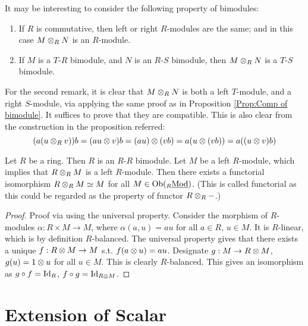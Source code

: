\documentclass{article}
\begin{document}
\begin{remark}
    It may be interesting to consider the following property of bimodules:
    \begin{enumerate}
        \item If $R$ is commutative, then left or right $R$-modules are the same; and in this case $M \otimes_R N$ is an $R$-module. 
        \item If $M$ is a $T$-$R$ bimodule, and $N$ is an $R$-$S$ bimodule, then $M \otimes_R N$ is a $T$-$S$ bimodule.
    \end{enumerate}

    For the second remark, it is clear that $M \otimes_R N$ is both a left $T$-module, and a right $S$-module, via applying the same proof as in Proposition \ref{Prop:Comp of bimodule}. It suffices to prove that they are compatible. This is also clear from the construction in the proposition referred:
    \[
        (a(u \otimes_R v)) b = (au \otimes v) b = (au) \otimes (vb) = a(u \otimes (vb)) = a ((u\otimes v) b)
    \]
\end{remark}

\begin{remark}
    Let $R$ be a ring. Then $R$ is an $R$-$R$ bimodule. Let $M$ be a left $R$-module, which implies that $R \otimes_R M$ is a left $R$-module. Then there exists a functorial isomorphism $R \otimes_R M \simeq M$ for all $M \in \mathrm{Ob}({}_{R}\underline{\textup{Mod}})$. (This is called functorial as this could be regarded as the property of functor $R \otimes_R -$.)
\end{remark}

\begin{proof}
    Proof via using the universal property. Consider the morphism of $R$-modules $\alpha: R \times M \to M$, where $\alpha(a, u) = au$ for all $a \in R$, $u \in M$. It is $R$-linear, which is by definition $R$-balanced. The universal property gives that there exists a unique $f: R \otimes M \to M$ s.t. $f(a \otimes u) = au$. Designate $g: M \to R \otimes M$, $g(u) = 1 \otimes u$ for all $u\in M$. This is clearly $R$-balanced. This gives an isomorphism as $g \circ f = \mathrm{Id}_R$, $f \circ g = \mathrm{Id}_{R \otimes M}$.
\end{proof}

\section{Extension of Scalar}
\end{document}
